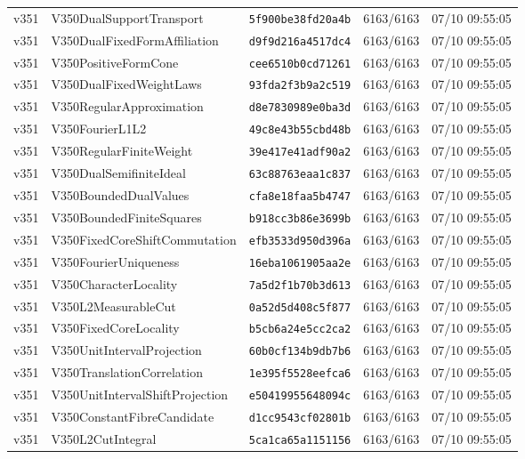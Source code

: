 \documentclass[11pt]{article}
\theoremstyle{definition}\newtheorem{deriv}{Derivação}
\begin{document}
{\begin{longtable}{@{}lllll@{}}
v351 & V350DualSupportTransport & \texttt{5f900be38fd20a4b} & 6163/6163 & 07/10 09:55:05 \\
v351 & V350DualFixedFormAffiliation & \texttt{d9f9d216a4517dc4} & 6163/6163 & 07/10 09:55:05 \\
v351 & V350PositiveFormCone & \texttt{cee6510b0cd71261} & 6163/6163 & 07/10 09:55:05 \\
v351 & V350DualFixedWeightLaws & \texttt{93fda2f3b9a2c519} & 6163/6163 & 07/10 09:55:05 \\
v351 & V350RegularApproximation & \texttt{d8e7830989e0ba3d} & 6163/6163 & 07/10 09:55:05 \\
v351 & V350FourierL1L2 & \texttt{49c8e43b55cbd48b} & 6163/6163 & 07/10 09:55:05 \\
v351 & V350RegularFiniteWeight & \texttt{39e417e41adf90a2} & 6163/6163 & 07/10 09:55:05 \\
v351 & V350DualSemifiniteIdeal & \texttt{63c88763eaa1c837} & 6163/6163 & 07/10 09:55:05 \\
v351 & V350BoundedDualValues & \texttt{cfa8e18faa5b4747} & 6163/6163 & 07/10 09:55:05 \\
v351 & V350BoundedFiniteSquares & \texttt{b918cc3b86e3699b} & 6163/6163 & 07/10 09:55:05 \\
v351 & V350FixedCoreShiftCommutation & \texttt{efb3533d950d396a} & 6163/6163 & 07/10 09:55:05 \\
v351 & V350FourierUniqueness & \texttt{16eba1061905aa2e} & 6163/6163 & 07/10 09:55:05 \\
v351 & V350CharacterLocality & \texttt{7a5d2f1b70b3d613} & 6163/6163 & 07/10 09:55:05 \\
v351 & V350L2MeasurableCut & \texttt{0a52d5d408c5f877} & 6163/6163 & 07/10 09:55:05 \\
v351 & V350FixedCoreLocality & \texttt{b5cb6a24e5cc2ca2} & 6163/6163 & 07/10 09:55:05 \\
v351 & V350UnitIntervalProjection & \texttt{60b0cf134b9db7b6} & 6163/6163 & 07/10 09:55:05 \\
v351 & V350TranslationCorrelation & \texttt{1e395f5528eefca6} & 6163/6163 & 07/10 09:55:05 \\
v351 & V350UnitIntervalShiftProjection & \texttt{e50419955648094c} & 6163/6163 & 07/10 09:55:05 \\
v351 & V350ConstantFibreCandidate & \texttt{d1cc9543cf02801b} & 6163/6163 & 07/10 09:55:05 \\
v351 & V350L2CutIntegral & \texttt{5ca1ca65a1151156} & 6163/6163 & 07/10 09:55:05 \\

\end{longtable}}
\end{document}
